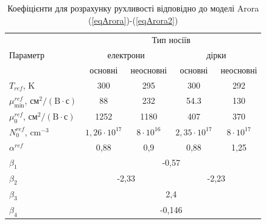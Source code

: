 \documentclass[14pt,a4paper,titlepage,oneside]{book}
\numberwithin{equation}{part}
\begin{document}
\begin{table}
\caption{Коефіцієнти для розрахунку рухливості відповідно до моделі Arora (\ref{eqArora})-(\ref{eqArora2})}
\label{tblArora}
\centering
\begin{tabular}{|l|c|c|c|c|}
\hline
\multirow{3}{*}{Параметр} & \multicolumn{4}{c|}{Тип носіїв}\\
\cline{2-5}
&\multicolumn{2}{c|}{електрони}&\multicolumn{2}{c|}{дірки}\\
\cline{2-5}
& основні \cite{Arora1982}& неосновні \cite{Swirhun1986}& основні \cite{Arora1982}& неосновні \cite{Alamo1985}\\
\hline
$T_{ref}$, K&300&295&300&292\\
\hline
$\mu_\mathrm{min}^{ref}$, $\text{см}^2/(\text{B}\cdot\text{с})$&88&232&54.3&130\\
\hline
$\mu_0^{ref}$, $\text{см}^2/(\text{B}\cdot\text{с})$&1252&1180&407&370\\
\hline
$N_0^{ref}$, cm$^{-3}$&$1,26\cdot10^{17}$&$8\cdot10^{16}$&$2,35\cdot10^{17}$&$8\cdot10^{17}$\\
\hline
$\alpha^{ref}$&0,88&0,9&0,88&1,25\\
\hline
$\beta_1$&\multicolumn{4}{c|}{-0,57}\\
\hline
$\beta_2$&\multicolumn{2}{c|}{-2,33}&\multicolumn{2}{c|}{-2,23}\\
\hline
$\beta_3$&\multicolumn{4}{c|}{2,4}\\
\hline
$\beta_4$&\multicolumn{4}{c|}{-0,146}\\
\hline
\end{tabular}
\end{table}
\end{document}
